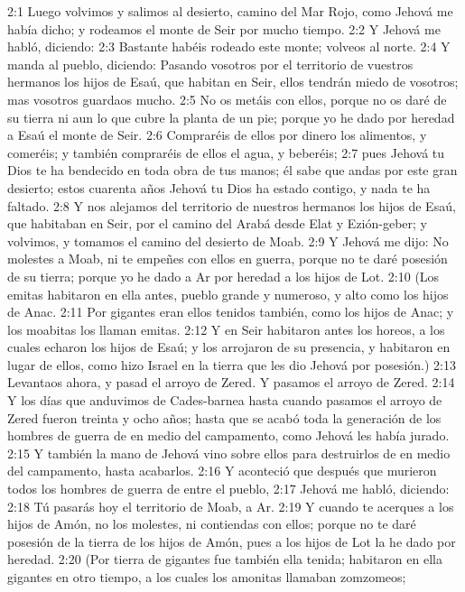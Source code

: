 2:1 Luego volvimos y salimos al desierto, camino del Mar Rojo, como Jehová me había dicho; y rodeamos el monte de Seir por mucho tiempo.  
2:2 Y Jehová me habló, diciendo:  
2:3 Bastante habéis rodeado este monte; volveos al norte.  
2:4 Y manda al pueblo, diciendo: Pasando vosotros por el territorio de vuestros hermanos los hijos de Esaú, que habitan en Seir, ellos tendrán miedo de vosotros; mas vosotros guardaos mucho.  
2:5 No os metáis con ellos, porque no os daré de su tierra ni aun lo que cubre la planta de un pie; porque yo he dado por heredad a Esaú el monte de Seir.  
2:6 Compraréis de ellos por dinero los alimentos, y comeréis; y también compraréis de ellos el agua, y beberéis;  
2:7 pues Jehová tu Dios te ha bendecido en toda obra de tus manos; él sabe que andas por este gran desierto; estos cuarenta años Jehová tu Dios ha estado contigo, y nada te ha faltado.  
2:8 Y nos alejamos del territorio de nuestros hermanos los hijos de Esaú, que habitaban en Seir, por el camino del Arabá desde Elat y Ezión-geber; y volvimos, y tomamos el camino del desierto de Moab.  
2:9 Y Jehová me dijo: No molestes a Moab, ni te empeñes con ellos en guerra, porque no te daré posesión de su tierra; porque yo he dado a Ar por heredad a los hijos de Lot.  
2:10 (Los emitas habitaron en ella antes, pueblo grande y numeroso, y alto como los hijos de Anac.  
2:11 Por gigantes eran ellos tenidos también, como los hijos de Anac; y los moabitas los llaman emitas.  
2:12 Y en Seir habitaron antes los horeos, a los cuales echaron los hijos de Esaú; y los arrojaron de su presencia, y habitaron en lugar de ellos, como hizo Israel en la tierra que les dio Jehová por posesión.)  
2:13 Levantaos ahora, y pasad el arroyo de Zered. Y pasamos el arroyo de Zered.  
2:14 Y los días que anduvimos de Cades-barnea hasta cuando pasamos el arroyo de Zered fueron treinta y ocho años; hasta que se acabó toda la generación de los hombres de guerra de en medio del campamento, como Jehová les había jurado. 
2:15 Y también la mano de Jehová vino sobre ellos para destruirlos de en medio del campamento, hasta acabarlos.  
2:16 Y aconteció que después que murieron todos los hombres de guerra de entre el pueblo,  
2:17 Jehová me habló, diciendo:  
2:18 Tú pasarás hoy el territorio de Moab, a Ar.  
2:19 Y cuando te acerques a los hijos de Amón, no los molestes, ni contiendas con ellos; porque no te daré posesión de la tierra de los hijos de Amón, pues a los hijos de Lot la he dado por heredad.  
2:20 (Por tierra de gigantes fue también ella tenida; habitaron en ella gigantes en otro tiempo, a los cuales los amonitas llamaban zomzomeos;  

